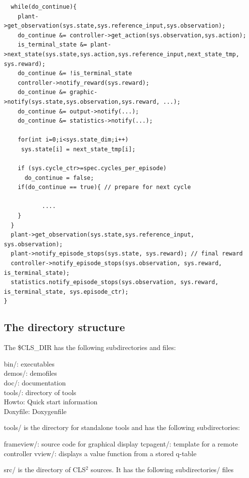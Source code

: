 \documentclass[a4paper,12pt,german]{article}
\newcommand{\cls}{{CLS$^2$ }}
\newcommand{\clsdir}{{\$CLS\_DIR}}
\begin{document}
\begin{footnotesize}
\begin{verbatim}
  while(do_continue){
    plant->get_observation(sys.state,sys.reference_input,sys.observation);
    do_continue &= controller->get_action(sys.observation,sys.action);  
    is_terminal_state &= plant->next_state(sys.state,sys.action,sys.reference_input,next_state_tmp, sys.reward); 
    do_continue &= !is_terminal_state
    controller->notify_reward(sys.reward);
    do_continue &= graphic->notify(sys.state,sys.observation,sys.reward, ...);
    do_continue &= output->notify(...);
    do_continue &= statistics->notify(...);

    for(int i=0;i<sys.state_dim;i++)
     sys.state[i] = next_state_tmp[i];
   
    if (sys.cycle_ctr>=spec.cycles_per_episode)
      do_continue = false;
    if(do_continue == true){ // prepare for next cycle
    
           ....
    }
  }
  plant->get_observation(sys.state,sys.reference_input, sys.observation);
  plant->notify_episode_stops(sys.state, sys.reward); // final reward
  controller->notify_episode_stops(sys.observation, sys.reward, is_terminal_state);
  statistics.notify_episode_stops(sys.observation, sys.reward, is_terminal_state, sys.episode_ctr);
}
\end{verbatim}
\end{footnotesize}


\subsection{The directory structure}

The \clsdir{ } has the following subdirectories and files:

bin/: executables\\
demos/: demofiles\\
doc/: documentation\\
tools/: directory of tools\\
Howto: Quick start information\\
Doxyfile: Doxygenfile 

tools/ is the directory for standalone tools and has the following subdirectories:

frameview/: source code for graphical display
tcpagent/: template for a remote controller 
vview/: displays a value function from a stored q-table

src/ is the directory of  \cls sources. It has the following subdirectories/ files
\end{document}
